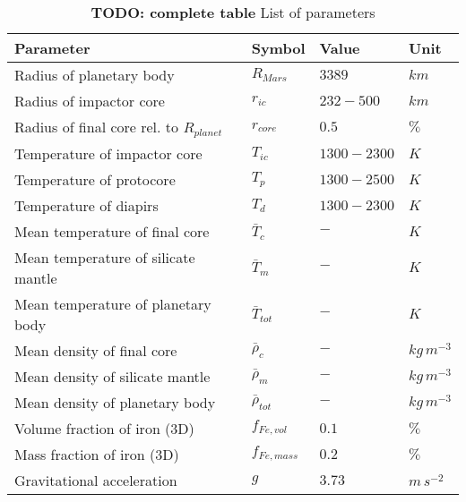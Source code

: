 \begin{table}[H]
\small
\centering
\begin{tabular}{p{6cm} l l l}
\toprule
Parameter & Symbol & Value & Unit\\
\midrule
Radius of planetary body 			& $R_{Mars}$ 			& $3389$ 		& $km$\\
Radius of impactor core 			& $r_{ic}$ 				& $232-500$ 	& $km$\\
Radius of final core rel. to $R_{planet}$ & $r_{core}$ 		& $0.5$ 		& $\%$\\
Temperature of impactor core 		& $T_{ic}$ 				& $1300-2300$	& $K$\\
Temperature of protocore 			& $T_p$ 				& $1300-2500$	& $K$\\
Temperature of diapirs 				& $T_d$ 				& $1300-2300$	& $K$\\
Mean temperature of final core 		& $\bar{T}_c$ 			& $-$ 		& $K$\\
Mean temperature of silicate mantle & $\bar{T}_m$ 			& $-$ 		& $K$\\
Mean temperature of planetary body 	& $\bar{T}_{tot}$ 		& $-$ 		& $K$\\
Mean density of final core			& $\bar{\rho}_c$ 		& $-$ 		& $kg\,m^{-3}$\\
Mean density of silicate mantle 	& $\bar{\rho}_m$ 		& $-$ 		& $kg\,m^{-3}$\\
Mean density of planetary body 		& $\bar{\rho}_{tot}$ 	& $-$ 		& $kg\,m^{-3}$\\
Volume fraction of iron (3D)		& $f_{Fe,vol}$ 			& $0.1$ 		& $\%$\\
Mass fraction of iron (3D)			& $f_{Fe,mass}$			& $0.2$			& $\%$\\
Gravitational acceleration			& $g$					& $3.73$		& $m\,s^{-2}$\\
\bottomrule
\end{tabular}
\caption{\textbf{TODO: complete table} List of parameters}
\label{tbl:list_of_parameters}
\end{table}
